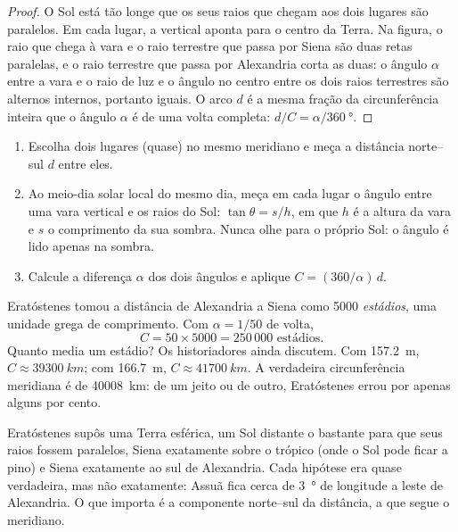 \begin{proof}
O Sol está tão longe que os seus raios que chegam aos dois lugares são
paralelos. Em cada lugar, a vertical aponta para o centro da Terra. Na
figura, o raio que chega à vara e o raio terrestre que passa por Siena são
duas retas paralelas, e o raio terrestre que passa por Alexandria corta as
duas: o ângulo $\alpha$ entre a vara e o raio de luz e o ângulo no centro
entre os dois raios terrestres são alternos internos, portanto iguais. O
arco $d$ é a mesma fração da circunferência inteira que o ângulo $\alpha$
é de uma volta completa: $d/C = \alpha/\qty{360}{\degree}$.
\end{proof}

\begin{method}\label{met:g10:measuring-the-earth:shadows}
\begin{enumerate}
  \item Escolha dois lugares (quase) no mesmo meridiano e meça a distância
        norte--sul $d$ entre eles.
  \item Ao meio-dia solar local do mesmo dia, meça em cada lugar o ângulo
        entre uma vara vertical e os raios do Sol: $\tan \theta = s/h$,
        em que $h$ é a altura da vara e $s$ o comprimento da sua sombra.
        Nunca olhe para o próprio Sol: o ângulo é lido apenas na sombra.
  \item Calcule a diferença $\alpha$ dos dois ângulos e aplique
        $C = (360/\alpha)\,d$.
\end{enumerate}
\end{method}

\begin{example}\label{ex:g10:measuring-the-earth:numbers}
Eratóstenes tomou a distância de Alexandria a Siena como 5000
\emph{estádios}, uma unidade grega de comprimento. Com $\alpha = 1/50$ de
volta,
\[
  C = 50 \times 5000 = 250\,000 \text{ estádios}.
\]
Quanto media um estádio? Os historiadores ainda discutem. Com
\qty{157.2}{m}, $C \approx \qty{39300}{km}$; com \qty{166.7}{m},
$C \approx \qty{41700}{km}$. A verdadeira circunferência meridiana é de
\qty{40008}{km}: de um jeito ou de outro, Eratóstenes errou por apenas
alguns por cento.
\end{example}

\begin{remark}\label{rem:g10:measuring-the-earth:assumptions}
Eratóstenes supôs uma Terra esférica, um Sol distante o bastante para que
seus raios fossem paralelos, Siena exatamente sobre o trópico (onde o Sol
pode ficar a pino) e Siena exatamente ao sul de Alexandria. Cada hipótese
era quase verdadeira, mas não exatamente: Assuã fica cerca de
\qty{3}{\degree} de longitude a leste de Alexandria. O que importa é a
componente norte--sul da distância, a que segue o meridiano.
\end{remark}

